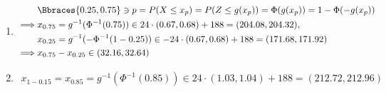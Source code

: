 \begin{solution}
\begin{enumerate}[label = (\alph*)]
    \item

    \begin{align*}
        &
        \Bbraces{0.25, 0.75} \ni p = P(X \leq x_p) = P(Z \leq g(x_p)) = \Phi(g(x_p)) = 1 - \Phi(-g(x_p)) \\
        \implies &
        x_{0.75} = g^{-1}(\Phi^{-1}(0.75))  \in  24 \cdot (0.67, 0.68) + 188 = (204.08, 204.32), \\
        &
        x_{0.25} = g^{-1}(-\Phi^{-1}(1 - 0.25)) \in -24 \cdot (0.67, 0.68) + 188 = (171.68, 171.92) \\
        \implies &
        x_{0.75} - x_{0.25} \in (32.16, 32.64)
    \end{align*}

    \item

    \begin{align*}
        x_{1 - 0.15}
        =
        x_{0.85}
        =
        g^{-1}(\Phi^{-1}(0.85))
        \in
        24 \cdot (1.03, 1.04) + 188
        =
        (212.72, 212.96)
    \end{align*}

\end{enumerate}


\end{solution}

